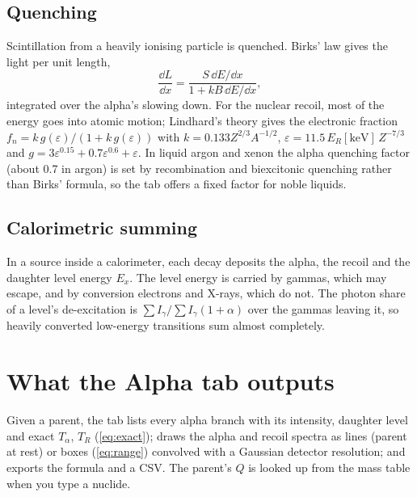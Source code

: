 \subsection{Quenching}
Scintillation from a heavily ionising particle is quenched. Birks' law gives the light per unit length,
\begin{equation}
\frac{\dd L}{\dd x} = \frac{S\,\dd E/\dd x}{1 + kB\,\dd E/\dd x},
\end{equation}
integrated over the alpha's slowing down. For the nuclear recoil, most of the energy goes into atomic motion; Lindhard's theory gives the electronic fraction $f_n = k\,g(\varepsilon)/(1+k\,g(\varepsilon))$ with $k = 0.133Z^{2/3}A^{-1/2}$, $\varepsilon = 11.5\,E_R[\text{keV}]\,Z^{-7/3}$ and $g = 3\varepsilon^{0.15} + 0.7\varepsilon^{0.6} + \varepsilon$. In liquid argon and xenon the alpha quenching factor (about 0.7 in argon) is set by recombination and biexcitonic quenching rather than Birks' formula, so the tab offers a fixed factor for noble liquids.

\subsection{Calorimetric summing}
In a source inside a calorimeter, each decay deposits the alpha, the recoil and the daughter level energy $E_x$. The level energy is carried by gammas, which may escape, and by conversion electrons and X-rays, which do not. The photon share of a level's de-excitation is $\sum I_\gamma / \sum I_\gamma(1+\alpha)$ over the gammas leaving it, so heavily converted low-energy transitions sum almost completely.
\section{What the Alpha tab outputs}
Given a parent, the tab lists every alpha branch with its intensity, daughter level and exact $T_\alpha$, $T_R$ (\cref{eq:exact}); draws the alpha and recoil spectra as lines (parent at rest) or boxes (\cref{eq:range}) convolved with a Gaussian detector resolution; and exports the formula and a CSV. The parent's $Q$ is looked up from the mass table when you type a nuclide.

